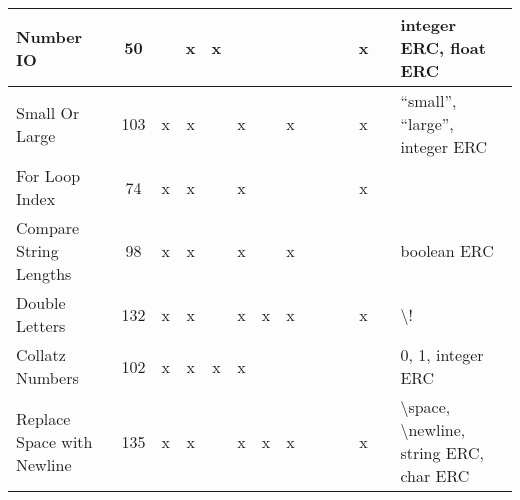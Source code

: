 \documentclass{sig-alternate}
\begin{document}
\begin{table*}
\begin{tabular}{|>{\raggedright}p{3.1cm}|c|ccccccccccc|>{\raggedright}p{5.5cm}|}
\hline
\hline
Number IO                  & 50              &      & x       & x     &         &      &        &                    &                  &                   & x     &            & integer ERC, float ERC                                                                                                                                                                                                      \tabularnewline
\hline
Small Or Large             & 103             & x    & x       &       & x       &      & x      &                    &                  &                   & x     &            & ``small'', ``large'', integer ERC                                                                                                                                                                                               \tabularnewline
\hline
For Loop Index             & 74              & x    & x       &       & x       &      &        &                    &                  &                   & x     &            &                                                                                                                                                                                                                             \tabularnewline
\hline
Compare String Lengths     & 98              & x    & x       &       & x       &      & x      &                    &                  &                   &       &            & boolean ERC                                                                                                                                                                                                                 \tabularnewline
\hline
Double Letters             & 132             & x    & x       &       & x       & x    & x      &                    &                  &                   & x     &            & \textbackslash !                                                                                                                                                                                                            \tabularnewline
\hline
Collatz Numbers            & 102             & x    & x       & x     & x       &      &        &                    &                  &                   &       &            & 0, 1, integer ERC                                                                                                                                                                                                           \tabularnewline
\hline
Replace Space with Newline & 135             & x    & x       &       & x       & x    & x      &                    &                  &                   & x     &            & \textbackslash space, \textbackslash newline, string ERC, char ERC                                                                                                                                                          \tabularnewline

\end{tabular}
\end{table*}
\end{document}
